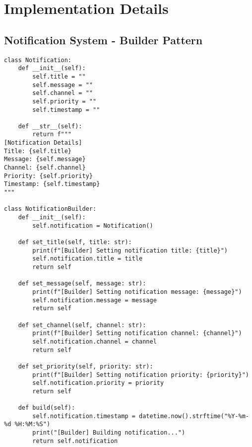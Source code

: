 \documentclass[12pt]{article}
\begin{document}
\section{Implementation Details}

\subsection{Notification System - Builder Pattern}
\begin{lstlisting}[caption=Notification and Builder Implementation]
class Notification:
    def __init__(self):
        self.title = ""
        self.message = ""
        self.channel = ""
        self.priority = ""
        self.timestamp = ""

    def __str__(self):
        return f"""
[Notification Details]
Title: {self.title}
Message: {self.message}
Channel: {self.channel}
Priority: {self.priority}
Timestamp: {self.timestamp}
"""

class NotificationBuilder:
    def __init__(self):
        self.notification = Notification()
    
    def set_title(self, title: str):
        print(f"[Builder] Setting notification title: {title}")
        self.notification.title = title
        return self
    
    def set_message(self, message: str):
        print(f"[Builder] Setting notification message: {message}")
        self.notification.message = message
        return self
    
    def set_channel(self, channel: str):
        print(f"[Builder] Setting notification channel: {channel}")
        self.notification.channel = channel
        return self
    
    def set_priority(self, priority: str):
        print(f"[Builder] Setting notification priority: {priority}")
        self.notification.priority = priority
        return self
    
    def build(self):
        self.notification.timestamp = datetime.now().strftime("%Y-%m-%d %H:%M:%S")
        print("[Builder] Building notification...")
        return self.notification
\end{lstlisting}
\end{document}
